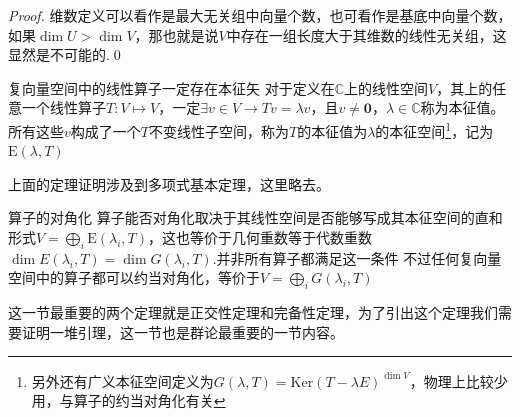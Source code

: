 \begin{proof}
    维数定义可以看作是最大无关组中向量个数，也可看作是基底中向量个数，如果$\dim U > \dim V$，那也就是说$V$中存在一组长度大于其维数的线性无关组，这显然是不可能的.\qed
\end{proof}
\begin{theorem}{复向量空间中的线性算子一定存在本征矢}
    对于定义在$\mathbb{C}$上的线性空间$V$，其上的任意一个线性算子$T:V\mapsto V$，一定$\exists v\in V\rightarrow Tv=\lambda v$，且$v\neq\mathbf{0}$，$\lambda\in\mathbb{C}$称为本征值。
    所有这些$v$构成了一个$T$不变线性子空间，称为$T$的本征值为$\lambda$的本征空间\footnote{另外还有广义本征空间定义为$G(\lambda,T)=\mathrm{Ker}\left(T-\lambda E\right)^{\dim V}$，物理上比较少用，与算子的约当对角化有关}，记为$\mathrm{E}(\lambda,T)$
\end{theorem}
上面的定理证明涉及到多项式基本定理，这里略去。
\begin{theorem}{算子的对角化}
    算子能否对角化取决于其线性空间是否能够写成其本征空间的直和形式$V=\bigoplus\limits_i \mathrm{E}(\lambda_i,T)$，这也等价于几何重数等于代数重数$\dim E(\lambda_i,T)=\dim G(\lambda_i,T)$.并非所有算子都满足这一条件
    不过任何复向量空间中的算子都可以约当对角化，等价于$V=\bigoplus\limits_i G(\lambda_i,T)$
\end{theorem}

这一节最重要的两个定理就是正交性定理和完备性定理，为了引出这个定理我们需要证明一堆引理，这一节也是群论最重要的一节内容。

